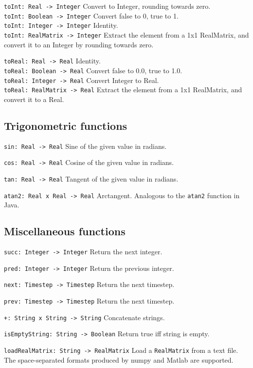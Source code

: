 \verb|toInt: Real -> Integer| Convert to Integer, rounding towards zero. \\
\verb|toInt: Boolean -> Integer| Convert false to 0, true to 1. \\
\verb|toInt: Integer -> Integer| Identity. \\
\verb|toInt: RealMatrix -> Integer| Extract the element from a 1x1 RealMatrix,
and convert it to an Integer by rounding towards zero.

\verb|toReal: Real -> Real| Identity. \\
\verb|toReal: Boolean -> Real| Convert false to 0.0, true to 1.0. \\
\verb|toReal: Integer -> Real| Convert Integer to Real. \\
\verb|toReal: RealMatrix -> Real| Extract the element from a 1x1 RealMatrix,
and convert it to a Real.


\subsection{Trigonometric functions}
\label{sec:builtin-trig}

\verb|sin: Real -> Real| Sine of the given value in radians.

\verb|cos: Real -> Real| Cosine of the given value in radians.

\verb|tan: Real -> Real| Tangent of the given value in radians.

\verb|atan2: Real x Real -> Real| Arctangent. Analogous to the \verb|atan2|
function in Java.


\subsection{Miscellaneous functions}
\label{sec:builtin-misc}

\verb|succ: Integer -> Integer| Return the next integer.

\verb|pred: Integer -> Integer| Return the previous integer.

\verb|next: Timestep -> Timestep| Return the next timestep.

\verb|prev: Timestep -> Timestep| Return the next timestep.

\verb|+: String x String -> String| Concatenate strings.

\verb|isEmptyString: String -> Boolean| Return true iff string is empty.

\verb|loadRealMatrix: String -> RealMatrix| Load a \verb|RealMatrix| from a
text file. The space-separated formats produced by numpy and Matlab are
supported.


